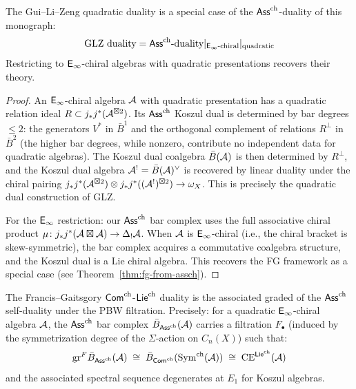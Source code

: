 \begin{proposition}\label{prop:glz-special-case}
The Gui--Li--Zeng quadratic duality is a special case of the $\mathsf{Ass}^{\mathrm{ch}}$-duality of this monograph:
\[
\text{GLZ duality} = \mathsf{Ass}^{\mathrm{ch}}\text{-duality} |_{\mathsf{E}_{\infty}\text{-chiral}} |_{\text{quadratic}}
\]
Restricting to $\mathsf{E}_{\infty}$-chiral algebras with quadratic presentations recovers their theory.
\end{proposition}

\begin{proof}
An $\mathsf{E}_{\infty}$-chiral algebra $\mathcal{A}$ with quadratic presentation has a quadratic relation ideal $R \subset j_*j^*(\mathcal{A}^{\boxtimes 2})$.  Its $\mathsf{Ass}^{\mathrm{ch}}$ Koszul dual is determined by bar degrees $\leq 2$: the generators $V^*$ in $\bar{B}^1$ and the orthogonal complement of relations $R^\perp$ in $\bar{B}^2$ (the higher bar degrees, while nonzero, contribute no independent data for quadratic algebras).  The Koszul dual coalgebra $\bar{B}(\mathcal{A})$ is then determined by $R^\perp$, and the Koszul dual algebra $\mathcal{A}^! = \bar{B}(\mathcal{A})^\vee$ is recovered by linear duality under the chiral pairing $j_*j^*(\mathcal{A}^{\boxtimes 2}) \otimes j_*j^*((\mathcal{A}^!)^{\boxtimes 2}) \to \omega_X$.  This is precisely the quadratic dual construction of GLZ.

For the $\mathsf{E}_{\infty}$ restriction: our $\mathsf{Ass}^{\mathrm{ch}}$ bar complex uses the full associative chiral product $\mu\colon j_*j^*(\mathcal{A} \boxtimes \mathcal{A}) \to \Delta_!\mathcal{A}$.  When $\mathcal{A}$ is $\mathsf{E}_{\infty}$-chiral (i.e., the chiral bracket is skew-symmetric), the bar complex acquires a commutative coalgebra structure, and the Koszul dual is a Lie chiral algebra.  This recovers the FG framework as a special case (see Theorem~\ref{thm:fg-from-assch}).
\end{proof}

\begin{theorem}\label{thm:fg-from-assch}
The Francis--Gaitsgory $\mathsf{Com}^{\mathrm{ch}}$-$\mathsf{Lie}^{\mathrm{ch}}$ duality is the associated graded of the $\mathsf{Ass}^{\mathrm{ch}}$ self-duality under the PBW filtration.  Precisely: for a quadratic $\mathsf{E}_{\infty}$-chiral algebra $\mathcal{A}$, the $\mathsf{Ass}^{\mathrm{ch}}$ bar complex $\bar{B}_{\mathsf{Ass}^{\mathrm{ch}}}(\mathcal{A})$ carries a filtration $F_\bullet$ (induced by the symmetrization degree of the $\Sigma$-action on $C_n(X)$) such that:
\begin{equation}\label{eq:fg-from-assch}
\mathrm{gr}^F \bar{B}_{\mathsf{Ass}^{\mathrm{ch}}}(\mathcal{A}) \;\cong\; \bar{B}_{\mathsf{Com}^{\mathrm{ch}}}(\mathrm{Sym}^{\mathrm{ch}}(\mathcal{A})) \;\cong\; \mathrm{CE}^{\mathsf{Lie}^{\mathrm{ch}}}(\mathcal{A})
\end{equation}
and the associated spectral sequence degenerates at $E_1$ for Koszul algebras.
\end{theorem}

